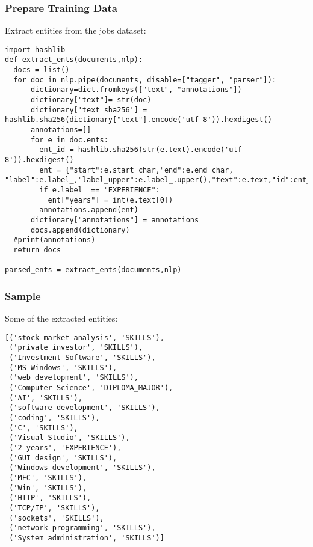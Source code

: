 \begin{frame}[fragile]\frametitle{Prepare Training Data}

Extract entities from the jobs dataset:

\begin{lstlisting}
import hashlib
def extract_ents(documents,nlp):
  docs = list()
  for doc in nlp.pipe(documents, disable=["tagger", "parser"]):
      dictionary=dict.fromkeys(["text", "annotations"])
      dictionary["text"]= str(doc)
      dictionary['text_sha256'] =  hashlib.sha256(dictionary["text"].encode('utf-8')).hexdigest()
      annotations=[]
      for e in doc.ents:
        ent_id = hashlib.sha256(str(e.text).encode('utf-8')).hexdigest()
        ent = {"start":e.start_char,"end":e.end_char, "label":e.label_,"label_upper":e.label_.upper(),"text":e.text,"id":ent_id}
        if e.label_ == "EXPERIENCE":
          ent["years"] = int(e.text[0])
        annotations.append(ent)
      dictionary["annotations"] = annotations
      docs.append(dictionary)
  #print(annotations)
  return docs
	
parsed_ents = extract_ents(documents,nlp)
\end{lstlisting}
	 
\end{frame}

\begin{frame}[fragile]\frametitle{Sample}

Some of the extracted entities:

\begin{lstlisting}
[('stock market analysis', 'SKILLS'),
 ('private investor', 'SKILLS'),
 ('Investment Software', 'SKILLS'),
 ('MS Windows', 'SKILLS'),
 ('web development', 'SKILLS'),
 ('Computer Science', 'DIPLOMA_MAJOR'),
 ('AI', 'SKILLS'),
 ('software development', 'SKILLS'),
 ('coding', 'SKILLS'),
 ('C', 'SKILLS'),
 ('Visual Studio', 'SKILLS'),
 ('2 years', 'EXPERIENCE'),
 ('GUI design', 'SKILLS'),
 ('Windows development', 'SKILLS'),
 ('MFC', 'SKILLS'),
 ('Win', 'SKILLS'),
 ('HTTP', 'SKILLS'),
 ('TCP/IP', 'SKILLS'),
 ('sockets', 'SKILLS'),
 ('network programming', 'SKILLS'),
 ('System administration', 'SKILLS')]
\end{lstlisting}
	 
\end{frame}

